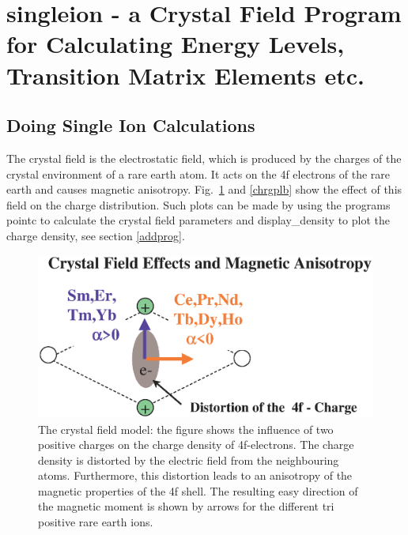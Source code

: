 \section{{\prg singleion} - a Crystal Field Program
for Calculating Energy Levels, Transition Matrix Elements etc.}\label{cfield}

\subsection{Doing Single Ion Calculations}
\label{cfieldsep}

The crystal field is the electrostatic field, which is produced by the
charges of the crystal environment of a rare earth atom. It acts on the
4f electrons of the rare earth and causes magnetic anisotropy. Fig.~\ref{chrgpla} and
\ref{chrgplb} show the effect of this field on the charge distribution.
Such plots can be made by using the programs {\prg pointc} to calculate
the crystal field parameters and
 {\prg display\_density} to plot the charge density, see section \ref{addprog}.

\begin{figure}[hb]
\includegraphics[angle=0,width=0.7\columnwidth]{figsrc/crystalfieldplot.eps}
\caption{\label{chrgpla}
The crystal field model: the figure shows the influence of two positive 
charges on the charge density of 4f-electrons. The
charge density is distorted by the electric field from the neighbouring atoms.
Furthermore, this distortion leads to an anisotropy of the magnetic properties
of the 4f shell. The resulting 
easy direction of the magnetic moment is shown by arrows for the different tri positive
rare earth ions.} 
\end{figure}

